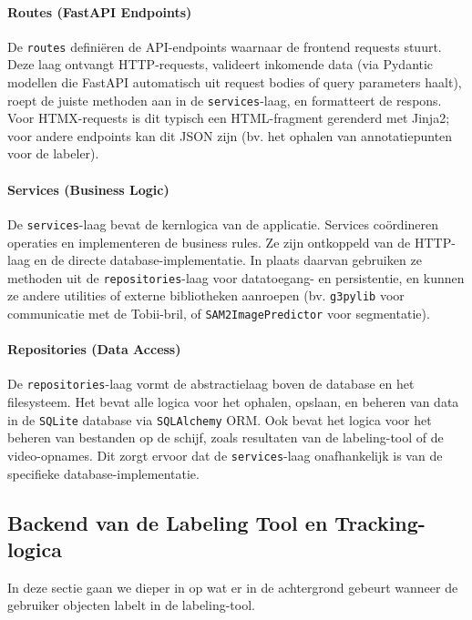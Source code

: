 \paragraph{Routes (FastAPI Endpoints)}
De \texttt{routes} definiëren de API-endpoints waarnaar de frontend requests stuurt.
Deze laag ontvangt HTTP-requests, valideert inkomende data 
(via Pydantic modellen die FastAPI automatisch uit request bodies of query parameters haalt), 
roept de juiste methoden aan in de \texttt{services}-laag, en formatteert de respons. 
Voor HTMX-requests is dit typisch een HTML-fragment gerenderd met Jinja2; voor andere endpoints kan dit JSON zijn 
(bv. het ophalen van annotatiepunten voor de labeler).

\paragraph{Services (Business Logic)}
De \texttt{services}-laag bevat de kernlogica van de applicatie.
Services coördineren operaties en implementeren de business rules. 
Ze zijn ontkoppeld van de HTTP-laag en de directe database-implementatie. 
In plaats daarvan gebruiken ze methoden uit de \texttt{repositories}-laag voor datatoegang- en persistentie, 
en kunnen ze andere utilities of externe bibliotheken aanroepen (bv. \texttt{g3pylib} voor communicatie met de Tobii-bril, of \texttt{SAM2ImagePredictor} voor segmentatie).

\paragraph{Repositories (Data Access)}
De \texttt{repositories}-laag vormt de abstractielaag boven de database en het filesysteem.
Het bevat alle logica voor het ophalen, opslaan, en beheren van data in de \texttt{SQLite} database via \texttt{SQLAlchemy} ORM.
Ook bevat het logica voor het beheren van bestanden op de schijf, zoals resultaten van de labeling-tool of de video-opnames.
Dit zorgt ervoor dat de \texttt{services}-laag onafhankelijk is van de specifieke database-implementatie.

\subsection{Backend van de Labeling Tool en Tracking-logica}
\label{sec:labeling-tool-logic}

In deze sectie gaan we dieper in op wat er in de achtergrond gebeurt wanneer de gebruiker objecten labelt in de labeling-tool.

